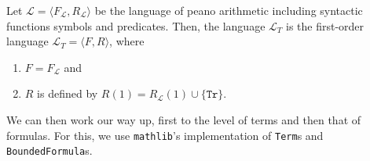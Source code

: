 \begin{definition}\label{def:lt}
    \leanok
    Let $\mathcal{L} = \langle F_{\mathcal{L}},R_{\mathcal{L}} \rangle$ be the language of peano arithmetic including syntactic functions symbols and predicates. Then, the language $\mathcal{L}_T$ is the first-order language $\mathcal{L}_T = \langle F, R \rangle$, where
    \begin{enumerate}
        \item $F = F_{\mathcal{L}}$ and
        \item $R$ is defined by $R(1) = R_{\mathcal{L}}(1) \cup \{\texttt{Tr}\}$.
    \end{enumerate}
\end{definition}

We can then work our way up, first to the level of terms and then that of formulas. For this, we use \texttt{mathlib}'s implementation of \texttt{Term}s and \texttt{BoundedFormula}s. 



